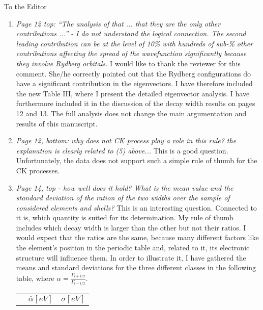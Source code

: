 \documentclass[DIN,pagenumber=false,parskip=half,fromalign=left,fromphone=false,fromemail=true,fromurl=false,fromlogo=false,fromrule=false]{scrlttr2}
\begin{document}
\begin{letter}{To the Editor}
\begin{enumerate}
 \item \emph{Page 12 top: ``The analysis of that ... that they are the only other
             contributions ...'' - I do not understand the logical connection.
             The second leading contribution can be at the level of 10\% with
             hundreds of sub-\% other contributions affecting the spread of the
             wavefunction significantly because they involve Rydberg orbitals. }
             \newline
             I would like to thank the reviewer for this comment. She/he
             correctly pointed out that the Rydberg configurations do have a
             significant contribution in the eigenvectors. I have therefore
             included the new Table III, where I present the detailed
             eigenvector analysis. I have furthermore included it in the
             discussion of the decay width results on pages 12 and 13.
             The full analysis does
             not change the main argumentation and results of this manuscript.
 \item \emph{Page 12, bottom: why does not CK process play a role in this rule?
             the explanation is clearly related to (5) above... } \newline
             This is a good question. Unfortunately, the data does
             not support such a simple rule of thumb
             for the CK processes.
 \item \emph{Page 14, top - how well does it hold? What is the mean value and the
             standard deviation of the ration of the two widths over the sample of
             considered elements and shells?} \newline
             This is an interesting question. Connected to it is, which quantity
             is suited for its determination. My rule of thumb includes which
             decay width is larger than the other but not their ratios. I would
             expect that the ratios are the same, because
             many different factors like the element's
             position in the periodic table and, related to it, its electronic 
             structure will influence them. In order to illustrate it,
             I have gathered the means and standard deviations for the three
             different classes in the following table, where
             $\alpha = \frac{\Gamma_{l+1/2}}{\Gamma_{l-1/2}}$.
\begin{center}
\begin{tabular}{lrr}
\toprule
     & $\overline{\alpha} [\unit{eV}]$ & $\sigma [\unit{eV}]$ \\

\end{tabular}
\end{center}
\end{enumerate}
\end{letter}
\end{document}
